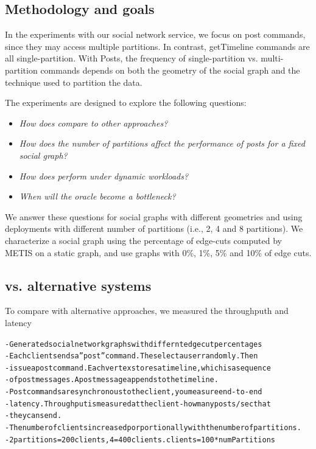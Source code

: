 \subsection{Methodology and goals}
\label{sec:evaluation:methodology}

In the experiments with our social network service, we focus on post
commands, since they may access multiple partitions. In contrast,
getTimeline commands are all single-partition.  With Posts, the
frequency of single-partition vs. multi-partition commands depends on
both the geometry of the social graph and the technique used to
partition the data.

The experiments are designed to explore the following questions:
\begin{itemize}
\item \emph{How does \dynastar compare to other approaches?} 
\item \emph{How does the number of partitions affect the performance of posts for a fixed social graph?}
\item \emph{How does \dynastar perform under dynamic workloads?}
\item \emph{When will the oracle become a bottleneck?}
\end{itemize}

\noindent
We answer these questions for social graphs with different geometries
and using deployments with different number of partitions (i.e., 2, 4
and 8 partitions).  We characterize a social graph using the
percentage of edge-cuts computed by METIS on a static graph, and use
graphs with 0\%, 1\%, 5\% and 10\% of edge cuts.


\subsection{\dynastar vs. alternative systems}
\label{sec:evaluation:results}

To compare \dynastar with alternative approaches, we measured
the throughputh and latency


\begin{alltt}\scriptsize
  - Generated social network graphs with differnt edge cut percentages
  - Each client sends a ''post'' command. The select a user randomly. Then
  - issue a post command. Each vertex stores a timeline, which is a sequence
  - of post messages. A post message appends to the timeline.
  - Post commands are synchronous to the client, you measure end-to-end
  - latency. Throughput is measured at the client - how many posts/sec that
  - they can send.
  - The number of clients increased porportionally with the number of partitions.
  - 2 partitions = 200 clients, 4 = 400 clients. clients = 100 * numPartitions
\end{alltt}


